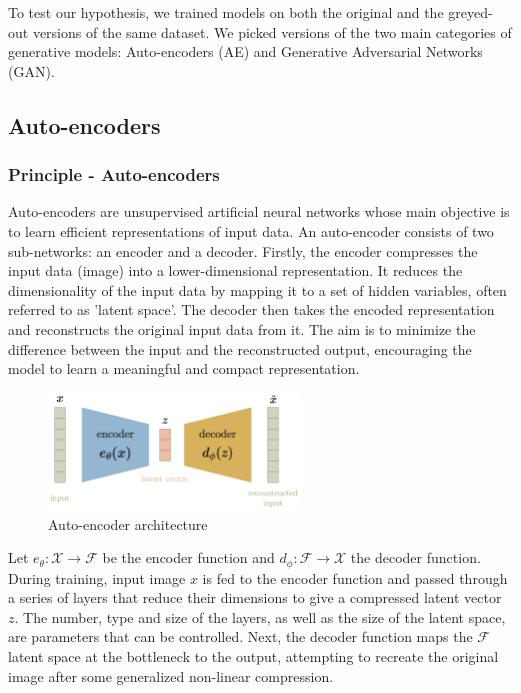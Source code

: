 \documentclass{article}
\begin{document}
To test our hypothesis, we trained models on both the original and the greyed-out versions of the same dataset. 
We picked versions of the two main categories of generative models: Auto-encoders (AE) and Generative Adversarial Networks (GAN).

\subsection{Auto-encoders}
\subsubsection*{Principle - Auto-encoders}

\quad Auto-encoders are unsupervised artificial neural networks whose main objective is to learn efficient representations of input data. 
An auto-encoder consists of two sub-networks: an encoder and a decoder. 
Firstly, the encoder compresses the input data (image) into a lower-dimensional representation. 
It reduces the dimensionality of the input data by mapping it to a set of hidden variables, often referred to as 'latent space'. 
The decoder then takes the encoded representation and reconstructs the original input data from it. 
The aim is to minimize the difference between the input and the reconstructed output, encouraging the model to learn a meaningful and compact representation.

\begin{figure}[H]
    \centering
    \includegraphics[width=0.6\textwidth]{images/ae.png}
    \caption{Auto-encoder architecture}
\end{figure}

Let $e_{\theta}:\mathcal{X}\to \mathcal{F}$ be the encoder function and $d_{\phi}:\mathcal{F}\to \mathcal{X}$ the decoder function. 
During training, input image $x$ is fed to the encoder function and passed through a series of layers that reduce their dimensions to give a compressed latent vector $z$. 
The number, type and size of the layers, as well as the size of the latent space, are parameters that can be controlled. 
Next, the decoder function maps the $\mathcal{F}$ latent space at the bottleneck to the output, attempting to recreate the original image after some generalized non-linear compression. 
\end{document}
